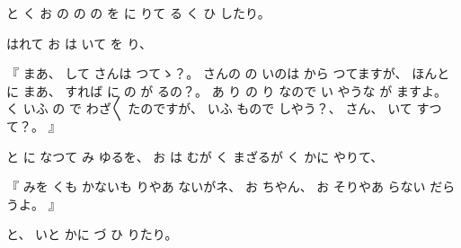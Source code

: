 %
と
く
お
の
の
の
を
に
りて
る
く
ひ
したり。

%
はれて
お
は
いて
を
り、

%
『
まあ、
%
して
さんは
つてゝ？。
%
さんの
の
いのは
から
つてますが、
%
ほんとに
まあ、
%
すれば
に%
の
が
るの？。
%
あ
り
の
り
なので
い
やうな
が
ますよ。
%
く
いふ
の
で
わざ〳〵
たのですが、
いふ
もので
しやう？、
%
さん、
%
いて
すつて？。
』

%
と
に
なつて
み
ゆるを、
%
お
は
むが
く
まざるが
く
かに
やりて、

%
『
みを
くも
かないも
りやあ
ないがネ、
%
お
ちやん、
%
お
そりやあ
らない
だらうよ。
』

%
と、
%
いと
かに
づ
ひ
りたり。
